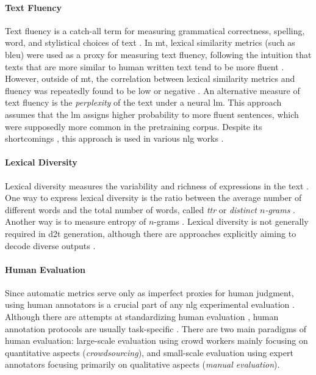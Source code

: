 {\paragraph{Text Fluency} Text fluency is a catch-all term for measuring grammatical correctness, spelling, word, and stylistical choices of text \cite{celikyilmazEvaluationTextGeneration2021}. In \ac{mt}, lexical similarity metrics (such as \acs{bleu}) were used as a proxy for measuring text fluency, following the intuition that texts that are more similar to human written text tend to be more fluent \cite{papineni2002bleu,celikyilmazEvaluationTextGeneration2021}. However, outside of \ac{mt}, the correlation between lexical similarity metrics and fluency was repeatedly found to be low or negative \cite{novikovaWhyWeNeed2017,fabbri2021summeval,nekvinda2021shades}. An alternative measure of text fluency is the \emph{perplexity} of the text under a neural \ac{lm}. This approach assumes that the \ac{lm} assigns higher probability to more fluent sentences, which were supposedly more common in the pretraining corpus. Despite its shortcomings \cite{wang2022perplexity}, this approach is used in various \ac{nlg} works \cite{kann2018sentence,wang2020cat,kaneNUBIANeUralBased2020,liu2021can,leeFactualityEnhancedLanguage2022}.


\paragraph{Lexical Diversity} Lexical diversity measures the variability and richness of expressions in the text \cite{vanmiltenburgMeasuringDiversityAutomatic2018}. One way to express lexical diversity is the ratio between the average number of different words and the total number of words, called \emph{\ac{ttr}} or \emph{distinct $n$-grams} \cite{johnson1944studies,li2016diversity}. Another way is to measure entropy of $n$-grams \cite{shannon1948mathematical}.
Lexical diversity is not generally required in \ac{d2t} generation, although there are approaches explicitly aiming to decode diverse outputs \cite{hanGeneratingDiverseDescriptions2021,perlitzDiversityEnhancedTabletoText2022}.

\paragraph{Human Evaluation} Since automatic metrics serve only as imperfect proxies for human judgment, using human annotators is a crucial part of any \ac{nlg} experimental evaluation \cite{gehrmannRepairingCrackedFoundation2022}. Although there are attempts at standardizing human evaluation \cite{thomsonGoldStandardMethodology2020}, human annotation protocols are usually task-specific \cite{van2019best,belzDisentanglingPropertiesHuman2020,howcroft2020twenty}. There are two main paradigms of human evaluation: large-scale evaluation using crowd workers mainly focusing on quantitative aspects (\emph{crowdsourcing}), and small-scale evaluation using expert annotators focusing primarily on qualitative aspects (\emph{manual evaluation}).

}
